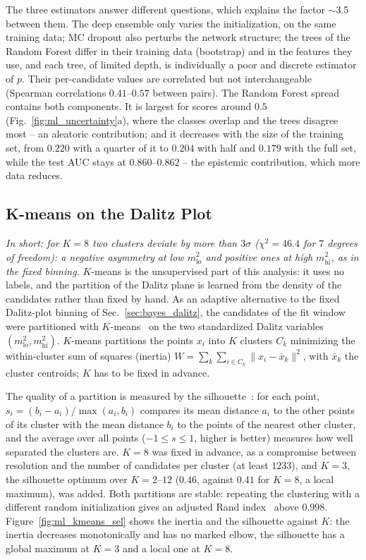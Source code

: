 The three estimators answer different questions, which explains the factor $\sim$3.5 between them. The deep ensemble only varies the initialization, on the same training data; MC dropout also perturbs the network structure; the trees of the Random Forest differ in their training data (bootstrap) and in the features they use, and each tree, of limited depth, is individually a poor and discrete estimator of $p$. Their per-candidate values are correlated but not interchangeable (Spearman correlations $0.41$--$0.57$ between pairs). The Random Forest spread contains both components. It is largest for scores around $0.5$ (Fig.~\ref{fig:ml_uncertainty}a), where the classes overlap and the trees disagree most -- an aleatoric contribution; and it decreases with the size of the training set, from $0.220$ with a quarter of it to $0.204$ with half and $0.179$ with the full set, while the test AUC stays at $0.860$--$0.862$ -- the epistemic contribution, which more data reduces.



\subsection{K-means on the Dalitz Plot}
\label{sec:ml_kmeans}
\emph{In short: for $K=8$ two clusters deviate by more than $3\sigma$ ($\chi^2=46.4$ for $7$ degrees of freedom): a negative asymmetry at low $m^2_{\mathrm{lo}}$ and positive ones at high $m^2_{\mathrm{hi}}$, as in the fixed binning.}
$K$-means is the unsupervised part of this analysis: it uses no labels, and the partition of the Dalitz plane is learned from the density of the candidates rather than fixed by hand. As an adaptive alternative to the fixed Dalitz-plot binning of Sec.~\ref{sec:bayes_dalitz}, the candidates of the fit window were partitioned with $K$-means~\cite{lloyd_kmeans} on the two standardized Dalitz variables $(m^2_{\mathrm{lo}},m^2_{\mathrm{hi}})$. $K$-means partitions the points $x_i$ into $K$ clusters $C_k$ minimizing the within-cluster sum of squares (inertia) $W=\sum_k\sum_{i\in C_k}\lVert x_i-\bar x_k\rVert^2$, with $\bar x_k$ the cluster centroids; $K$ has to be fixed in advance.

The quality of a partition is measured by the silhouette~\cite{silhouette}: for each point, $s_i=(b_i-a_i)/\max(a_i,b_i)$ compares its mean distance $a_i$ to the other points of its cluster with the mean distance $b_i$ to the points of the nearest other cluster, and the average over all points ($-1\le s\le 1$, higher is better) measures how well separated the clusters are. $K=8$ was fixed in advance, as a compromise between resolution and the number of candidates per cluster (at least $1233$), and $K=3$, the silhouette optimum over $K=2$--$12$ ($0.46$, against $0.41$ for $K=8$, a local maximum), was added. Both partitions are stable: repeating the clustering with a different random initialization gives an adjusted Rand index~\cite{hubert_ari} above $0.998$. Figure~\ref{fig:ml_kmeans_sel} shows the inertia and the silhouette against $K$: the inertia decreases monotonically and has no marked elbow, the silhouette has a global maximum at $K=3$ and a local one at $K=8$.

